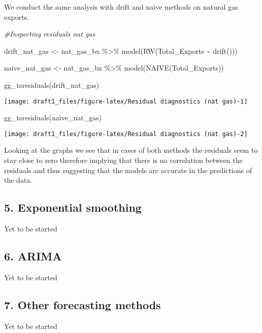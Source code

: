 \documentclass[
]{article}
\newenvironment{Shaded}{\begin{snugshade}}{\end{snugshade}}
\newcommand{\CommentTok}[1]{\textcolor[rgb]{0.56,0.35,0.01}{\textit{#1}}}
\newcommand{\FunctionTok}[1]{\textcolor[rgb]{0.00,0.00,0.00}{#1}}
\newcommand{\NormalTok}[1]{#1}
\newcommand{\OtherTok}[1]{\textcolor[rgb]{0.56,0.35,0.01}{#1}}
\newcommand{\SpecialCharTok}[1]{\textcolor[rgb]{0.00,0.00,0.00}{#1}}
\begin{document}
We conduct the same analysis with drift and naive methods on natural gas
exports.

\begin{Shaded}
\begin{Highlighting}[]
\CommentTok{\#Inspecting residuals nat gas}

\NormalTok{drift\_nat\_gas }\OtherTok{\textless{}{-}}\NormalTok{ nat\_gas\_bx }\SpecialCharTok{\%\textgreater{}\%} 
  \FunctionTok{model}\NormalTok{(}\FunctionTok{RW}\NormalTok{(Total\_Exports }\SpecialCharTok{\textasciitilde{}} \FunctionTok{drift}\NormalTok{()))}

\NormalTok{naive\_nat\_gas }\OtherTok{\textless{}{-}}\NormalTok{ nat\_gas\_bx }\SpecialCharTok{\%\textgreater{}\%} 
  \FunctionTok{model}\NormalTok{(}\FunctionTok{NAIVE}\NormalTok{(Total\_Exports))}

\FunctionTok{gg\_tsresiduals}\NormalTok{(drift\_nat\_gas)}
\end{Highlighting}
\end{Shaded}

\begin{center}\texttt{[image: draft1\_files/figure-latex/Residual diagnostics (nat gas)-1]} \end{center}

\begin{Shaded}
\begin{Highlighting}[]
\FunctionTok{gg\_tsresiduals}\NormalTok{(naive\_nat\_gas)}
\end{Highlighting}
\end{Shaded}

\begin{center}\texttt{[image: draft1\_files/figure-latex/Residual diagnostics (nat gas)-2]} \end{center}

Looking at the graphs we see that in cases of both methods the residuals
seem to stay close to zero therefore implying that there is no
correlation between the residuals and thus suggesting that the models
are accurate in the predictions of the data.

\hypertarget{exponential-smoothing}{%
\subsection{5. Exponential smoothing}\label{exponential-smoothing}}

Yet to be started

\hypertarget{arima}{%
\subsection{6. ARIMA}\label{arima}}

Yet to be started

\hypertarget{other-forecasting-methods}{%
\subsection{7. Other forecasting
methods}\label{other-forecasting-methods}}

Yet to be started
\end{document}
